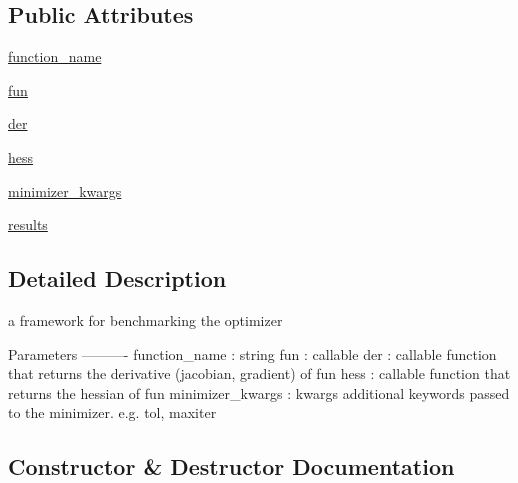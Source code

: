 \subsection*{Public Attributes}
\begin{DoxyCompactItemize}
\item 
\hyperlink{classbench__optimizers_1_1__BenchOptimizers_ad9dab38557b2158ea2e21293271e385e}{function\+\_\+name}
\item 
\hyperlink{classbench__optimizers_1_1__BenchOptimizers_af8a715948d979dfc5618356fe04b2cf1}{fun}
\item 
\hyperlink{classbench__optimizers_1_1__BenchOptimizers_a106f4acfad30abe085c0b7ceca2a85f3}{der}
\item 
\hyperlink{classbench__optimizers_1_1__BenchOptimizers_a72d3ff07ec2b9adad2967ec13d3239b4}{hess}
\item 
\hyperlink{classbench__optimizers_1_1__BenchOptimizers_a01ab07cf0f468957aae6c722c81f646b}{minimizer\+\_\+kwargs}
\item 
\hyperlink{classbench__optimizers_1_1__BenchOptimizers_a2091e381f35bb5b7a8d88049369b5167}{results}
\end{DoxyCompactItemize}


\subsection{Detailed Description}
\begin{DoxyVerb}a framework for benchmarking the optimizer

Parameters
----------
function_name : string
fun : callable
der : callable
    function that returns the derivative (jacobian, gradient) of fun
hess : callable
    function that returns the hessian of fun
minimizer_kwargs : kwargs
    additional keywords passed to the minimizer.  e.g. tol, maxiter
\end{DoxyVerb}
 

\subsection{Constructor \& Destructor Documentation}
\hypertarget{classbench__optimizers_1_1__BenchOptimizers_a0741b148516ba806effabfe4e407b179}{}
